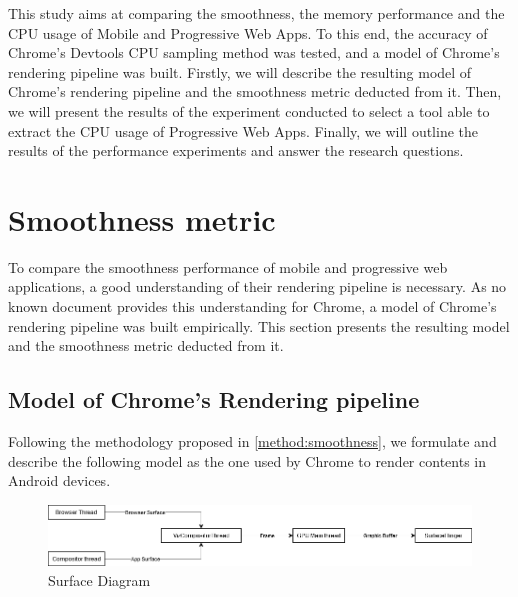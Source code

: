 \documentclass{kththesis}
\begin{document}
This study aims at comparing the smoothness, the memory performance and the CPU usage of Mobile and Progressive Web Apps. To this end, the accuracy of Chrome's Devtools CPU sampling method was tested, and a model of Chrome's rendering pipeline was built. 
Firstly, we will describe the resulting model of Chrome's rendering pipeline and the smoothness metric deducted from it. Then, we will present the results of the experiment conducted to select a tool able to extract the CPU usage of Progressive Web Apps. Finally, we will outline the results of the performance experiments and answer the research questions.  




\section{Smoothness metric}

To compare the smoothness performance of mobile and progressive web applications, a good understanding of their rendering pipeline is necessary. As no known document provides this understanding for Chrome, a model of Chrome's rendering pipeline was built empirically. This section presents the resulting model and the smoothness metric deducted from it. 

\subsection{Model of Chrome's Rendering pipeline}
\label{results:chrome_model}

Following the methodology proposed in \autoref{method:smoothness}, we formulate and describe the following model as the one used by Chrome to render contents in Android devices.\newline

\begin{figure}[h]
    \centering
    \includegraphics[width=13cm]{kththesis/Figures/surface_diagram.png}
    \caption{Surface Diagram}
    \label{fig:surface_diagram}
\end{figure}
\end{document}
